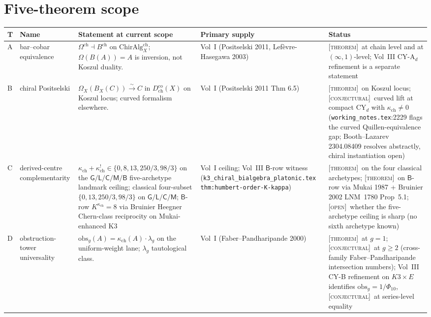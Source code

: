 \documentclass[11pt]{article}
\theoremstyle{definition}
\theoremstyle{remark}
\providecommand{\ChirAlg}{\mathrm{ChirAlg}}
\providecommand{\kch}{\kappa_{\mathrm{ch}}}
\providecommand{\ClaimStatusTheorem}{\textsc{[theorem]}}
\providecommand{\ClaimStatusConjectured}{\textsc{[conjectural]}}
\providecommand{\ClaimStatusOpen}{\textsc{[open]}}
\begin{document}
\section{Five-theorem scope}

\renewcommand{\arraystretch}{1.3}
\begin{longtable}{@{}p{0.6cm}p{2.5cm}p{5.0cm}p{3.0cm}p{3.3cm}@{}}
\toprule
\textbf{T} & \textbf{Name} & \textbf{Statement at current scope}
& \textbf{Primary supply} & \textbf{Status} \\
\midrule
\endfirsthead

A & bar--cobar equivalence
& $\Omega^{\mathrm{ch}}\dashv B^{\mathrm{ch}}$ on $\ChirAlg^{\mathrm{ch}}_X$;
$\Omega(B(A)) = A$ is inversion, not Koszul duality.
& Vol~I (Positselski 2011, Lef\`evre-Hasegawa 2003)
& \ClaimStatusTheorem\ at chain level and at $(\infty,1)$-level;
Vol~III CY-A$_d$ refinement is a separate statement
\\[0.3ex]

B & chiral Positselski
& $\Omega_X(B_X(C))\xrightarrow{\sim} C$ in $D^{\mathrm{co}}_{\mathrm{ch}}(X)$
on Koszul locus; curved formalism elsewhere.
& Vol~I (Positselski 2011 Thm 6.5)
& \ClaimStatusTheorem\ on Koszul locus;
\ClaimStatusConjectured\ curved lift at compact CY$_d$ with
$\kch\neq 0$ (\texttt{working\_notes.tex}:2229 flags the curved
Quillen-equivalence gap; Booth--Lazarev 2304.08409 resolves abstractly,
chiral instantiation open)
\\[0.3ex]

C & derived-centre complementarity
& $\kch + \kch^! \in\{0, 8, 13, 250/3, 98/3\}$ on the
$\mathsf{G}/\mathsf{L}/\mathsf{C}/\mathsf{M}/\mathsf{B}$ five-archetype
landmark ceiling; classical four-subset
$\{0,13,250/3,98/3\}$ on $\mathsf{G}/\mathsf{L}/\mathsf{C}/\mathsf{M}$;
$\mathsf{B}$-row $K^{\kch} = 8$ via Bruinier Heegner Chern-class
reciprocity on Mukai-enhanced K3
& Vol~I ceiling; Vol~III $\mathsf{B}$-row witness
(\texttt{k3\_chiral\_bialgebra\_platonic.tex}
\texttt{thm:humbert-order-K-kappa})
& \ClaimStatusTheorem\ on the four classical archetypes;
\ClaimStatusTheorem\ on $\mathsf{B}$-row via Mukai 1987 +
Bruinier 2002 LNM~1780 Prop~5.1; \ClaimStatusOpen\ whether the
five-archetype ceiling is sharp (no sixth archetype known)
\\[0.3ex]

D & obstruction-tower universality
& $\mathrm{obs}_g(A) = \kch(A)\cdot\lambda_g$ on the
uniform-weight lane; $\lambda_g$ tautological class.
& Vol~I (Faber--Pandharipande 2000)
& \ClaimStatusTheorem\ at $g = 1$; \ClaimStatusConjectured\ at
$g\geq 2$ (cross-family Faber--Pandharipande intersection numbers);
Vol~III CY-B refinement on $K3\times E$ identifies
$\mathrm{obs}_g = 1/\Phi_{10}$, \ClaimStatusConjectured\
at series-level equality
\\[0.3ex]


\end{longtable}
\end{document}
